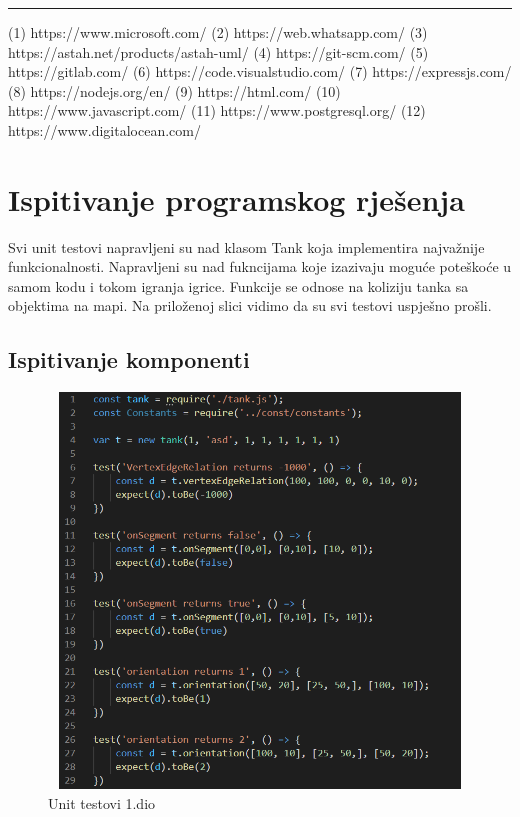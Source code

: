 		 	 \hrule
		 	 \hfill \break
		 	 {(1) https://www.microsoft.com/
		 	 \hfill \break
		 	 (2) https://web.whatsapp.com/
		 	 \hfill \break
		 	 (3) https://astah.net/products/astah-uml/
		 	 \hfill \break
		 	 (4) https://git-scm.com/
		 	 \hfill \break
		 	 (5) https://gitlab.com/
		 	 \hfill \break
		 	 (6) https://code.visualstudio.com/
		 	 \hfill \break
		 	 (7) https://expressjs.com/
		 	 \hfill \break
		 	 (8) https://nodejs.org/en/
		 	 \hfill \break
		 	 (9) https://html.com/
		 	 \hfill \break
		 	 (10) https://www.javascript.com/
		 	 \hfill \break
		 	 (11) https://www.postgresql.org/
		 	 \hfill \break
		 	 (12) https://www.digitalocean.com/
		 	 
		 	 
		 	 
		 	 
		 	 
			
			
			\eject 
		
	
		\section{Ispitivanje programskog rješenja}
			{Svi unit testovi napravljeni su nad klasom Tank koja implementira najvažnije funkcionalnosti. Napravljeni su nad fukncijama koje izazivaju moguće poteškoće u samom kodu i tokom igranja igrice. Funkcije se odnose na koliziju tanka sa objektima na mapi. Na priloženoj slici vidimo da su svi testovi uspješno prošli.}

			\subsection{Ispitivanje komponenti}
			\begin{figure}[h]
				\centering
				\includegraphics[width=18.5cm,height=10.5cm]{unitTests1}
				\caption{Unit testovi 1.dio}
				\label{fig:ut1}
			\end{figure}
		
}
